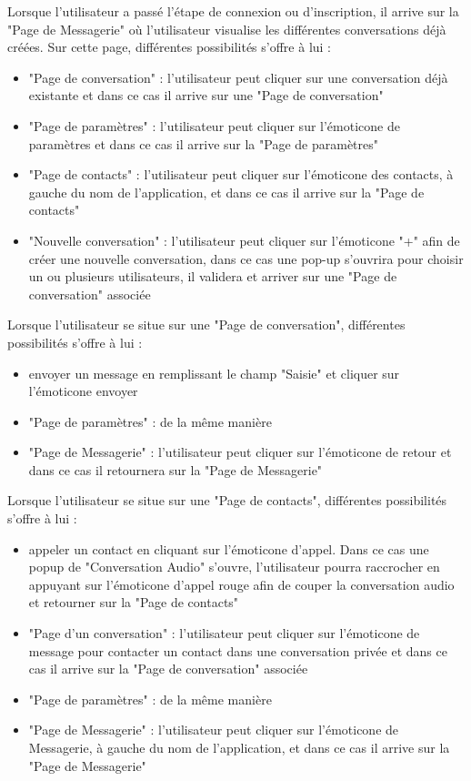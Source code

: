 \documentclass[a4paper,12pt]{article}
\begin{document}
	Lorsque l'utilisateur a passé l'étape de connexion ou d'inscription, il arrive sur la "Page de Messagerie" où l'utilisateur visualise les différentes conversations déjà créées. Sur cette page, différentes possibilités s'offre à lui :
	\begin{itemize}
		\item "Page de conversation" : l'utilisateur peut cliquer sur une conversation déjà existante et dans ce cas il arrive sur une "Page de conversation"
		\item "Page de paramètres" : l'utilisateur peut cliquer sur l'émoticone de paramètres et dans ce cas il arrive sur la "Page de paramètres"
		\item "Page de contacts" : l'utilisateur peut cliquer sur l'émoticone des contacts, à gauche du nom de l'application, et dans ce cas il arrive sur la "Page de contacts"
		\item "Nouvelle conversation" : l'utilisateur peut cliquer sur l'émoticone "+" afin de créer une nouvelle conversation, dans ce cas une pop-up s'ouvrira pour choisir un ou plusieurs utilisateurs, il validera et arriver sur une "Page de conversation" associée\\
	\end{itemize}

	Lorsque l'utilisateur se situe sur une "Page de conversation", différentes possibilités s'offre à lui :
	\begin{itemize}
		\item envoyer un message en remplissant le champ "Saisie" et cliquer sur l'émoticone envoyer
		\item "Page de paramètres" : de la même manière
		\item "Page de Messagerie" : l'utilisateur peut cliquer sur l'émoticone de retour et dans ce cas il retournera sur la "Page de Messagerie"\\
	\end{itemize}

	\newpage

	Lorsque l'utilisateur se situe sur une "Page de contacts", différentes possibilités s'offre à lui :
	\begin{itemize}
		\item appeler un contact en cliquant sur l'émoticone d'appel.
		Dans ce cas une popup de "Conversation Audio" s'ouvre, l'utilisateur pourra raccrocher en appuyant sur l'émoticone d'appel rouge afin de couper la conversation audio et retourner sur la "Page de contacts"
		\item "Page d'un conversation" : l'utilisateur peut cliquer sur l'émoticone de message pour contacter un contact dans une conversation privée et dans ce cas il arrive sur la "Page de conversation" associée
		\item "Page de paramètres" : de la même manière
		\item "Page de Messagerie" : l'utilisateur peut cliquer sur l'émoticone de Messagerie, à gauche du nom de l'application, et dans ce cas il arrive sur la "Page de Messagerie"\\
	\end{itemize}
\end{document}
